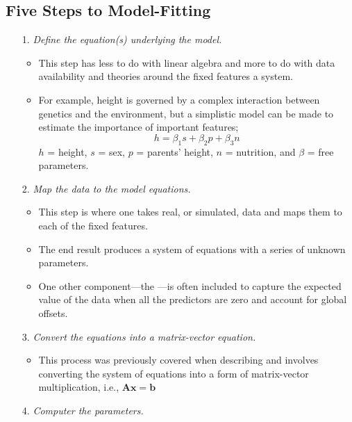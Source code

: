 \begin{itemize}
  \subsection{Five Steps to Model-Fitting}\label{Five Steps to Model-Fitting}
  \begin{itemize}
    \item[1.] \emph{Define the equation(s) underlying the model.} %
      \begin{itemize}
        \item This step has less to do with linear algebra and more to do with data availability and theories around the fixed features a system. 
        \item For example, height is governed by a complex interaction between genetics and the environment, but a simplistic model can be made to estimate the importance of important features; 
        \[%
        h = \beta_1 s + \beta_2 p + \beta_3 n 
        \]%
        \(h\) = height, \(s\) = sex, \(p\) = parents' height, \(n\) = nutrition, and \(\beta \) = free parameters.
      \end{itemize}
    \item[2.] \emph{Map the data to the model equations.}
      \begin{itemize}
        \item This step is where one takes real, or simulated, data and maps them to each of the fixed features. 
        \item The end result produces a system of equations with a series of unknown parameters. 
        \item One other component---the ---is often included to capture the expected value of the data when all the predictors are zero and account for global offsets. 
      \end{itemize}
    \item[3.] \emph{Convert the equations into a matrix-vector equation.}
      \begin{itemize}
        \item This process was previously covered when describing \hyperref[Elementary Operations]{} and involves converting the system of equations into a form of matrix-vector multiplication, i.e., \(\bm{Ax}=\bm{b}\)
      \end{itemize}
    \item[4.] \emph{Computer the parameters.}
      \begin{itemize}

\end{itemize}
\end{itemize}
\end{itemize}
